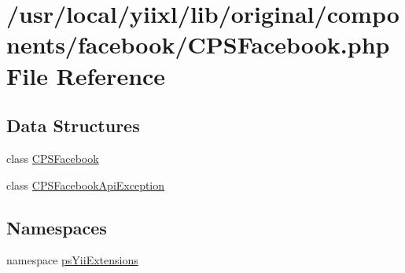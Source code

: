 \hypertarget{CPSFacebook_8php}{
\section{/usr/local/yiixl/lib/original/components/facebook/CPSFacebook.php File Reference}
\label{CPSFacebook_8php}
}
\subsection*{Data Structures}
\begin{DoxyCompactItemize}
\item 
class \hyperlink{classCPSFacebook}{CPSFacebook}
\item 
class \hyperlink{classCPSFacebookApiException}{CPSFacebookApiException}
\end{DoxyCompactItemize}
\subsection*{Namespaces}
\begin{DoxyCompactItemize}
\item 
namespace \hyperlink{namespacepsYiiExtensions}{psYiiExtensions}
\end{DoxyCompactItemize}
